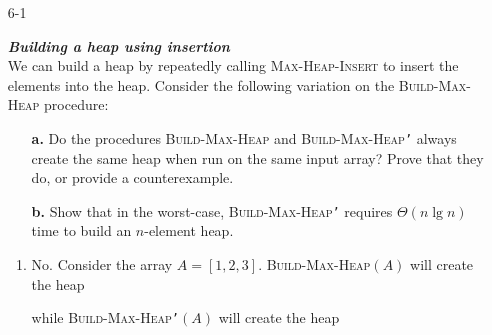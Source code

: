 \begin{enumerate}


\item[6{-}1]{\textbf{\emph{Building a heap using insertion}}\\
We can build a heap by repeatedly calling \textsc{Max-Heap-Insert} to insert
the elements into the heap. Consider the following variation on the
\textsc{Build-Max-Heap} procedure:

\begin{algorithm}[H]
\SetAlgoNoEnd\DontPrintSemicolon
\BlankLine
{}
\end{algorithm}

\begin{enumerate}
\item[\textbf{a.}]{Do the procedures \textsc{Build-Max-Heap} and
\textsc{Build-Max-Heap\texttt{'}} always create the same heap when run on the
same input array? Prove that they do, or provide a counterexample.}
\item[\textbf{b.}]{Show that in the worst-case,
\textsc{Build-Max-Heap\texttt{'}} requires $\Theta(n \lg n)$ time to build an
$n$-element heap.}
\end{enumerate}

}

\begin{framed}
\begin{enumerate}

\item No. Consider the array $A = [1, 2, 3]$. \textsc{Build-Max-Heap}$(A)$ will
create the heap
\begin{center}
\end{center}

while \textsc{Build-Max-Heap\texttt{'}}$(A)$ will create the heap

\begin{center}
\end{center}


\end{enumerate}
\end{framed}
\end{enumerate}
